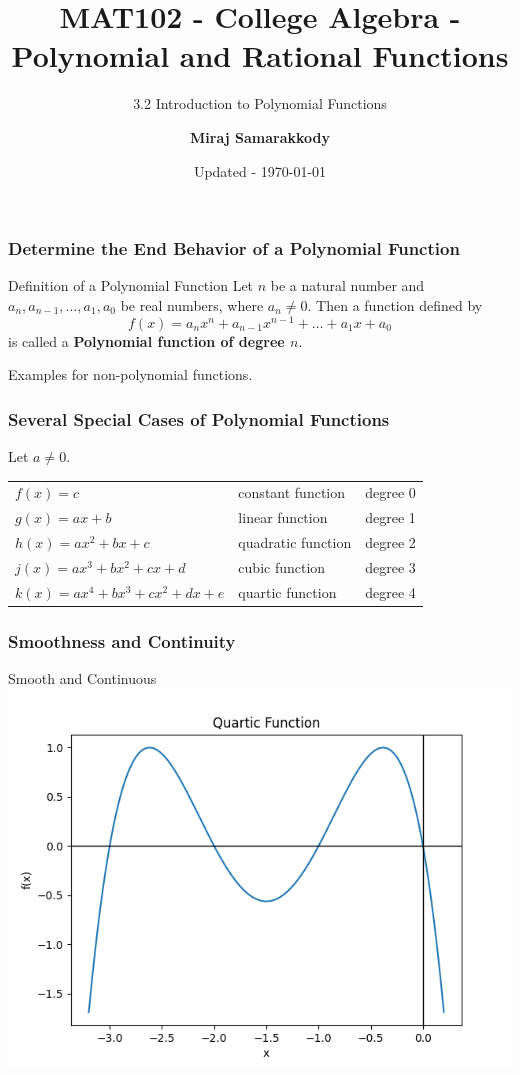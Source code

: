 \documentclass{beamer}
\title{MAT102 - College Algebra - Polynomial and Rational Functions}
\subtitle{3.2 Introduction to Polynomial Functions \cite{miller2016college}}
\author{\textbf{Miraj Samarakkody}}
\institute{Tougaloo College}
\date{Updated - \today}
\begin{document}
\begin{frame}
    \titlepage
\end{frame}

\begin{frame}
    \frametitle{Determine the End Behavior of a Polynomial Function}

    \begin{block}{Definition of a Polynomial Function}
        Let \(n\) be a natural number and \(a_n, a_{n-1}, \dots, a_1, a_0\) be real numbers, where \(a_n \ne 0\). Then a function defined by \[f(x)=a_n x^n+a_{n-1}x^{n-1}+\dots + a_1 x +a_0\]
        is called a \textbf{Polynomial function of degree \(n\)}. 
    \end{block}\pause
    \vspace{1cm}
    Examples for non-polynomial functions. 


\end{frame}

\begin{frame}
    \frametitle{Several Special Cases of Polynomial Functions}

    Let \(a \ne 0\). \\



\begin{tabular}{lll}
    \(f(x)=c\) & constant function  & degree 0\\
    \(g(x)=ax +b\) & linear function & degree 1 \\
    \(h(x)= ax^2+bx+c\) & quadratic function & degree 2 \\
    \(j(x)=ax^3+bx^2+cx+d\) & cubic function & degree 3 \\
    \(k(x)=ax^4+bx^3+cx^2+dx+e\)& quartic function & degree 4
\end{tabular}
    

\end{frame}

\begin{frame}
    \frametitle{Smoothness and Continuity}
Smooth and Continuous
    \includegraphics[scale=0.5]{figs/fig_1.png}

\end{frame}
\end{document}
